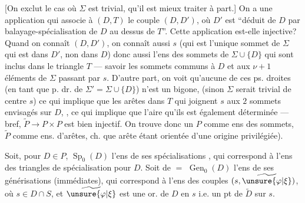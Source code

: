 [On exclut le cas où $\Sigma$ est trivial, qu'il est mieux traiter à part.] On a une application
qui associe à $(D,T)$ le couple $(D,D')$, où $D'$ est ``déduit de $D$ par balayage-spécialisation de $D$ au dessus de $T$''. Cette application est-elle injective? Quand on connaît $(D,D')$, on connaît aussi $s$ (qui est l'unique sommet de $\Sigma$ qui est dans $D'$, non dans $D$) donc aussi l'ens  des  sommets de $\Sigma\cup\{D\}$ qui sont inclus dans le triangle $T$ --- savoir les sommets communs à $D$ et aux $\nu+1$ éléments de $\Sigma$ passant par $s$. D'autre part, on voit qu'aucune de ces ps. droites (en tant que p. dr. de \deleted{$\unsure{\Sigma}$} $\Sigma'=\Sigma\cup\{D\}$) n'est un bigone,  (sinon $\Sigma$ serait trivial de centre $s$) ce qui implique que les arêtes  dans $T$ qui joignent $s$ aux $2$ sommets  envisagés sur $D$,    , ce qui implique que l'aire qu'ils  est également déterminée --- bref, $\widetilde P\to P\times P$ est bien injectif. On trouve donc un \uline{}  $P$ comme ens des sommets, $\widetilde P$ comme ens. d'arêtes, ch. que arête étant orientée  d'une origine privilégiée).


Soit, pour $D\in P$, $\operatorname{Sp}_0(D)$ l'ens de ses spécialisations ,  qui correspond à l'ens des triangles de spécialisation  pour $D$. Soit de $=$ $\operatorname{Gen}_0(D)$ l'ens de ses générisations (immédiates), qui correspond à l'ens des couples $(s,\widetilde{\unsure{\varphi|\xi}})$, où $s\in D\cap S$, et $\widetilde{\unsure{\varphi|\xi}}$ est une or. de $D$ en $s$ i.e. un pt de $\widetilde D$ sur $s$.



